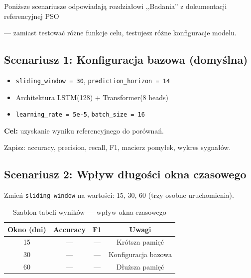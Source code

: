 \documentclass[12pt,a4paper]{report}
\begin{document}
Poniższe scenariusze odpowiadają rozdziałowi ,,Badania'' z dokumentacji referencyjnej PSO

--- zamiast testować różne funkcje celu, testujesz różne konfiguracje modelu.



\subsection{Scenariusz 1: Konfiguracja bazowa (domyślna)}



\begin{itemize}

    \item \texttt{sliding\_window = 30}, \texttt{prediction\_horizon = 14}

    \item Architektura LSTM(128) + Transformer(8 heads)

    \item \texttt{learning\_rate = 5e-5}, \texttt{batch\_size = 16}

\end{itemize}

\textbf{Cel:} uzyskanie wyniku referencyjnego do porównań.

Zapisz: accuracy, precision, recall, F1, macierz pomyłek, wykres sygnałów.



\subsection{Scenariusz 2: Wpływ długości okna czasowego}



Zmień \texttt{sliding\_window} na wartości: 15, 30, 60 (trzy osobne uruchomienia).



\begin{table}[H]

\centering

\caption{Szablon tabeli wyników --- wpływ okna czasowego}

\label{tab:okno}

\begin{tabular}{@{}cccc@{}}

\toprule

\textbf{Okno (dni)} & \textbf{Accuracy} & \textbf{F1} & \textbf{Uwagi} \\

\midrule

15  & --- & --- & Krótsza pamięć \\

30  & --- & --- & Konfiguracja bazowa \\

60  & --- & --- & Dłuższa pamięć \\

\bottomrule

\end{tabular}

\end{table}
\end{document}
